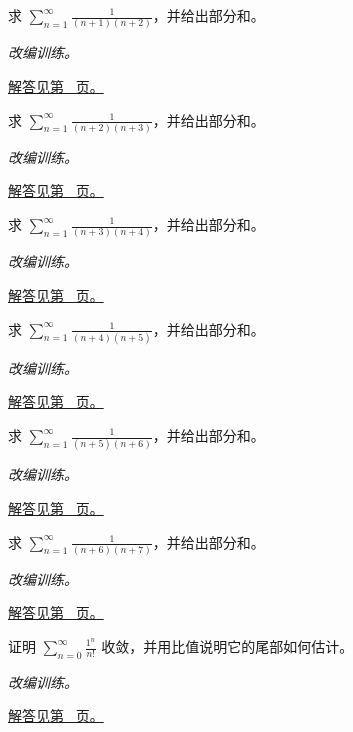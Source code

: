 \documentclass[12pt,fontset=fandol]{ctexart}
\begin{document}
\begin{example}[裂项求和]\label{ex:c24q7}
求 $\displaystyle\sum_{n=1}^\infty\frac{1}{(n+1)(n+2)}$，并给出部分和。
\par\textit{改编训练。}\par\hyperref[ans:c24q7]{解答见第~\pageref{ans:c24q7} 页。}
\end{example}
\begin{example}[裂项求和]\label{ex:c24q8}
求 $\displaystyle\sum_{n=1}^\infty\frac{1}{(n+2)(n+3)}$，并给出部分和。
\par\textit{改编训练。}\par\hyperref[ans:c24q8]{解答见第~\pageref{ans:c24q8} 页。}
\end{example}
\begin{example}[裂项求和]\label{ex:c24q9}
求 $\displaystyle\sum_{n=1}^\infty\frac{1}{(n+3)(n+4)}$，并给出部分和。
\par\textit{改编训练。}\par\hyperref[ans:c24q9]{解答见第~\pageref{ans:c24q9} 页。}
\end{example}
\begin{example}[裂项求和]\label{ex:c24q10}
求 $\displaystyle\sum_{n=1}^\infty\frac{1}{(n+4)(n+5)}$，并给出部分和。
\par\textit{改编训练。}\par\hyperref[ans:c24q10]{解答见第~\pageref{ans:c24q10} 页。}
\end{example}
\begin{example}[裂项求和]\label{ex:c24q11}
求 $\displaystyle\sum_{n=1}^\infty\frac{1}{(n+5)(n+6)}$，并给出部分和。
\par\textit{改编训练。}\par\hyperref[ans:c24q11]{解答见第~\pageref{ans:c24q11} 页。}
\end{example}
\begin{example}[裂项求和]\label{ex:c24q12}
求 $\displaystyle\sum_{n=1}^\infty\frac{1}{(n+6)(n+7)}$，并给出部分和。
\par\textit{改编训练。}\par\hyperref[ans:c24q12]{解答见第~\pageref{ans:c24q12} 页。}
\end{example}
\begin{example}[阶乘压过指数]\label{ex:c24q13}
证明 $\displaystyle\sum_{n=0}^\infty\frac{1^n}{n!}$ 收敛，并用比值说明它的尾部如何估计。
\par\textit{改编训练。}\par\hyperref[ans:c24q13]{解答见第~\pageref{ans:c24q13} 页。}
\end{example}
\end{document}
